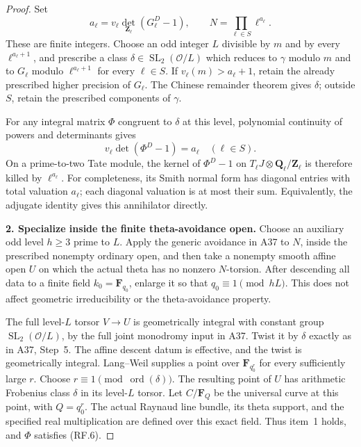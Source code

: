\documentclass[11pt,a4paper]{article}
\theoremstyle{definition}
\renewcommand{\paragraph}[1]{\par\smallskip\noindent\textbf{#1}\quad\ignorespaces}
\begin{document}
\begin{proof}
Set
\[
 a_\ell=v_\ell\det_{\mathbf Z_\ell}(G_\ell^D-1),
 \qquad N=\prod_{\ell\in S}\ell^{a_\ell}.                  \tag{RF.5}
\]
These are finite integers.  Choose an odd integer $L$ divisible
by $m$ and by every $\ell^{a_\ell+1}$, and prescribe a class
$\delta\in\operatorname{SL}_2(\mathcal O/L)$ which reduces to
$\gamma$ modulo $m$ and to $G_\ell$ modulo
$\ell^{a_\ell+1}$ for every $\ell\in S$.  If
$v_\ell(m)>a_\ell+1$, retain the already prescribed higher
precision of $G_\ell$.  The Chinese remainder theorem gives
$\delta$; outside $S$, retain the prescribed components of
$\gamma$.

For any integral matrix $\Phi$ congruent to $\delta$ at this
level, polynomial continuity of powers and determinants gives
\[
 v_\ell\det(\Phi^D-1)=a_\ell\quad(\ell\in S).              \tag{RF.6}
\]
On a prime-to-two Tate module, the kernel of $\Phi^D-1$ on
$T_\ell J\otimes\mathbf Q_\ell/\mathbf Z_\ell$ is therefore
killed by $\ell^{a_\ell}$.  For completeness, its Smith normal
form has diagonal entries with total valuation $a_\ell$;
each diagonal valuation is at most their sum.  Equivalently,
the adjugate identity gives this annihilator directly.

\paragraph{2. Specialize inside the finite theta-avoidance open.}
Choose an auxiliary odd level $h\geq3$ prime to $L$.
Apply the generic avoidance in A37 to $N$, inside the prescribed
nonempty ordinary open, and then take a nonempty smooth affine
open $U$ on which the actual theta has no nonzero $N$-torsion.
After descending all data to a finite field
$k_0=\mathbf F_{q_0}$, enlarge it so that
$q_0\equiv1\pmod{hL}$.  This does not affect geometric
irreducibility or the theta-avoidance property.

The full level-$L$ torsor $V\to U$ is geometrically integral
with constant group $\operatorname{SL}_2(\mathcal O/L)$, by
the full joint monodromy input in A37.  Twist it by $\delta$
exactly as in A37, Step~5.  The affine descent datum is effective,
and the twist is geometrically integral.  Lang--Weil supplies a
point over $\mathbf F_{q_0^r}$ for every sufficiently large $r$.
Choose $r\equiv1\pmod{\operatorname{ord}(\delta)}$.
The resulting point of $U$ has arithmetic Frobenius class
$\delta$ in its level-$L$ torsor.  Let $C/\mathbf F_Q$ be
the universal curve at this point, with $Q=q_0^r$.
The actual Raynaud line bundle, its theta support, and the
specified real multiplication are defined over this exact field.
Thus item~1 holds, and $\Phi$ satisfies (RF.6).


\end{proof}
\end{document}
